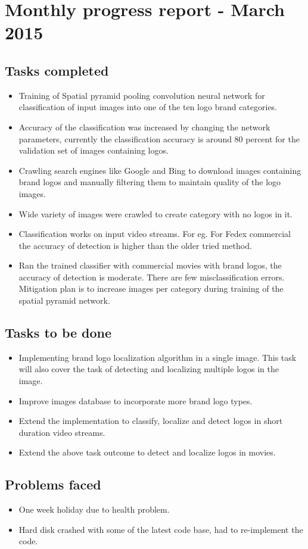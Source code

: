 \section{Monthly progress report - March 2015}
 
\subsection{Tasks completed}
\begin{itemize}
 \item Training of Spatial pyramid pooling convolution neural network for classification of input images into one of the ten logo brand categories.
 \item Accuracy of the classification was increased by changing the network parameters, currently the classification accuracy is around 80 percent for the validation set of images containing logos.
 \item Crawling search engines like Google and Bing to download images containing brand logos and manually filtering them to maintain quality of the logo images.
 \item Wide variety of images were crawled to create category with no logos in it.
 \item Classification works on input video streams. For eg. For Fedex commercial the accuracy of detection is higher than the older tried method.	
 \item Ran the trained classifier with commercial movies with brand logos, the accuracy of detection is moderate. There are few misclassification errors. Mitigation plan is to increase images per category during training of the spatial pyramid network.
\end{itemize}

\subsection{Tasks to be done}
\begin{itemize}
\item Implementing brand logo localization algorithm in a single image. This task will also cover the task of detecting and localizing multiple logos in the image.
\item Improve images database to incorporate more brand logo types.
\item Extend the implementation to classify, localize and detect logos in short duration video streams.
\item Extend the above task outcome to detect and localize logos in movies.  
\end{itemize}

\subsection{Problems faced}
\begin{itemize}
\item One week holiday due to health problem.
\item Hard disk crashed with some of the latest code base, had to re-implement the code. 
\end{itemize}